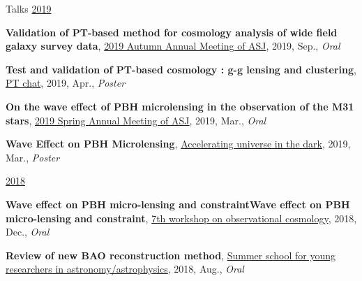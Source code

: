 \begin{rSection}{Talks}
\underline{2019}
\begin{etaremune}
\setcounter{enumi}{7}
\item \textbf{Validation of PT-based method for cosmology analysis of wide field galaxy survey data}, \href{https://www.asj.or.jp/nenkai/archive/2019b/pdf/U20a.pdf}{2019 Autumn Annual Meeting of ASJ}, 2019, Sep., \textit{Oral}
\item \textbf{Test and validation of PT-based cosmology : g-g lensing and clustering}, \href{http://pt-chat-kyoto.sciencesconf.org/}{PT chat}, 2019, Apr., \textit{Poster}
\item \textbf{On the wave effect of PBH microlensing in the observation of the M31 stars}, \href{https://www.asj.or.jp/nenkai/archive/2019a/pdf/U14a.pdf}{2019 Spring Annual Meeting of ASJ}, 2019, Mar., \textit{Oral}
\item \textbf{Wave Effect on PBH Microlensing}, \href{http://www2.yukawa.kyoto-u.ac.jp/~aud2019/index.php}{Accelerating universe in the dark}, 2019, Mar., \textit{Poster}
\end{etaremune}

\underline{2018}
\begin{etaremune}
\setcounter{enumi}{3}
\item \textbf{Wave effect on PBH micro-lensing and constraintWave effect on PBH micro-lensing and constraint}, \href{http://web.cc.yamaguchi-u.ac.jp/~rsaito/obscosmo2018/}{7th workshop on observational cosmology}, 2018, Dec., \textit{Oral}
\item \textbf{Review of new BAO reconstruction method}, \href{http://www.astro-wakate.org/ss2018/web/link.html}{Summer school for young researchers in astronomy/astrophysics}, 2018, Aug., \textit{Oral}
\end{etaremune}\end{rSection}
